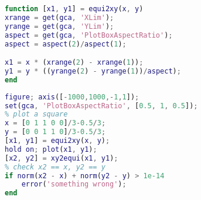 \begin{lstlisting}[language=matlab, caption=equi2xy.m]
% the inverse of function xy2equi
function [x1, y1] = equi2xy(x, y)
xrange = get(gca, 'XLim');
yrange = get(gca, 'YLim');
aspect = get(gca, 'PlotBoxAspectRatio');
aspect = aspect(2)/aspect(1);

x1 = x * (xrange(2) - xrange(1));
y1 = y * ((yrange(2) - yrange(1))/aspect);
end
\end{lstlisting}

\begin{lstlisting}[language=matlab, caption=xy2equi\_demo.m]
figure; axis([-1000,1000,-1,1]);
set(gca, 'PlotBoxAspectRatio', [0.5, 1, 0.5]);
% plot a square
x = [0 1 1 0 0]/3-0.5/3;
y = [0 0 1 1 0]/3-0.5/3;
[x1, y1] = equi2xy(x, y);
hold on; plot(x1, y1);
[x2, y2] = xy2equi(x1, y1);
% check x2 == x, y2 == y
if norm(x2 - x) + norm(y2 - y) > 1e-14
    error('something wrong');
end
\end{lstlisting}
